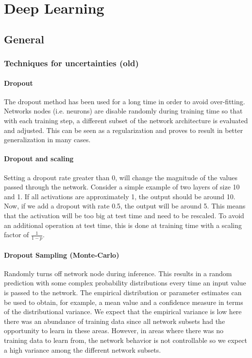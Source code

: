 \part{Deep Learning}
\chapter{General}

\section{Techniques for uncertainties (old)}

\subsection{Dropout}
The dropout method has been used for a long time in order to avoid over-fitting. Networks nodes (i.e. neurons) are disable randomly during training time so that with each training step, a different subset of the network architecture is evaluated and adjusted. This can be seen as a regularization and proves to result in better generalization in many cases.

\subsection{Dropout and scaling}
Setting a dropout rate greater than 0, will change the magnitude of the values passed through the network. Consider a simple example of two layers of size 10 and 1. If all activations are approximately 1, the output should be around 10. Now, if we add a dropout with rate 0.5, the output will be around 5. This means that the activation will be too big at test time and need to be rescaled. To avoid an additional operation at test time, this is done at training time with a scaling factor of $\frac{1}{1-p}$.


\subsection{Dropout Sampling (Monte-Carlo)}
Randomly turns off network node during inference. This results in a random prediction with some complex probability distributions every time an input value is passed to the network. The empirical distribution or parameter estimates can be used to obtain, for example, a mean value and a confidence measure in terms of the distributional variance. We expect that the empirical variance is low here there was an abundance of training data since all network subsets had the opportunity to learn in these areas. However, in areas where there was no training data to learn from, the network behavior is not controllable so we expect a high variance among the different network subsets.


